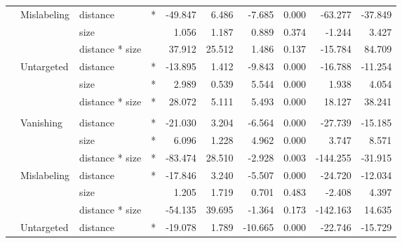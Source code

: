 \documentclass[
]{article}
\begin{document}
\begin{longtable}[t]{llllrrrrrr}
\cmidrule{2-10}\nopagebreak
\hspace{1em} & Mislabeling & distance & * & -49.847 & 6.486 & -7.685 & 0.000 & -63.277 & -37.849\\
\cmidrule{3-10}\nopagebreak
\hspace{1em} &  & size &  & 1.056 & 1.187 & 0.889 & 0.374 & -1.244 & 3.427\\
\cmidrule{3-10}\nopagebreak
\hspace{1em} &  & distance * size &  & 37.912 & 25.512 & 1.486 & 0.137 & -15.784 & 84.709\\
\cmidrule{2-10}\nopagebreak
\hspace{1em} & Untargeted & distance & * & -13.895 & 1.412 & -9.843 & 0.000 & -16.788 & -11.254\\
\cmidrule{3-10}\nopagebreak
\hspace{1em} &  & size & * & 2.989 & 0.539 & 5.544 & 0.000 & 1.938 & 4.054\\
\cmidrule{3-10}\nopagebreak
\hspace{1em} &  & distance * size & * & 28.072 & 5.111 & 5.493 & 0.000 & 18.127 & 38.241\\
\cmidrule{1-10}\pagebreak[0]
\addlinespace[0.3em]
\multicolumn{10}{l}{\textbf{Faster R-CNN}}\\
\hspace{1em} & Vanishing & distance & * & -21.030 & 3.204 & -6.564 & 0.000 & -27.739 & -15.185\\
\cmidrule{3-10}\nopagebreak
\hspace{1em} &  & size & * & 6.096 & 1.228 & 4.962 & 0.000 & 3.747 & 8.571\\
\cmidrule{3-10}\nopagebreak
\hspace{1em} &  & distance * size & * & -83.474 & 28.510 & -2.928 & 0.003 & -144.255 & -31.915\\
\cmidrule{2-10}\nopagebreak
\hspace{1em} & Mislabeling & distance & * & -17.846 & 3.240 & -5.507 & 0.000 & -24.720 & -12.034\\
\cmidrule{3-10}\nopagebreak
\hspace{1em} &  & size &  & 1.205 & 1.719 & 0.701 & 0.483 & -2.408 & 4.397\\
\cmidrule{3-10}\nopagebreak
\hspace{1em} &  & distance * size &  & -54.135 & 39.695 & -1.364 & 0.173 & -142.163 & 14.635\\
\cmidrule{2-10}\nopagebreak
\hspace{1em} & Untargeted & distance & * & -19.078 & 1.789 & -10.665 & 0.000 & -22.746 & -15.729\\

\end{longtable}
\end{document}
